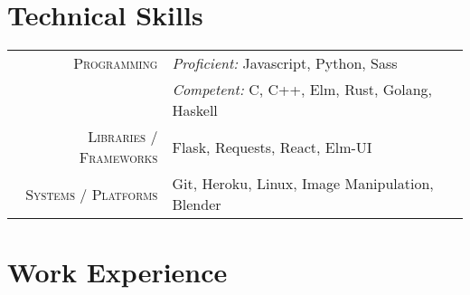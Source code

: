 \documentclass[a4paper,12pt]{extarticle} %
\begin{document}
\vspace{0.5cm}



\section{\textcolor{primary}{Technical Skills}}

\begin{tabular}{r|p{13cm}}
  \textsc{Programming}            & \textit{Proficient:} Javascript, Python, Sass          \\
                                  & \textit{Competent:} C, C++, Elm, Rust, Golang, Haskell \\
  \textsc{Libraries / Frameworks} & Flask, Requests, React, Elm-UI                         \\
  \textsc{Systems / Platforms}    & Git, Heroku, Linux, Image Manipulation, Blender        \\
\end{tabular}

\vspace{0.5cm}




\section{\textcolor{primary}{Work Experience}}
\end{document}
